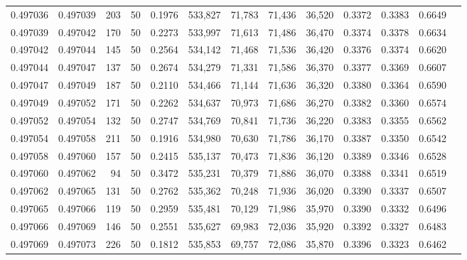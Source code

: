 \begin{tabular}{rrrrrrrrrrrrr}
0.497036 & 0.497039 &   203 &  50 &                                     0.1976 & 533,827 &  71,783 &  71,436 &  36,520 & 0.3372 & 0.3383 & 0.6649 \\
0.497039 & 0.497042 &   170 &  50 &                                     0.2273 & 533,997 &  71,613 &  71,486 &  36,470 & 0.3374 & 0.3378 & 0.6634 \\
0.497042 & 0.497044 &   145 &  50 &                                     0.2564 & 534,142 &  71,468 &  71,536 &  36,420 & 0.3376 & 0.3374 & 0.6620 \\
0.497044 & 0.497047 &   137 &  50 &                                     0.2674 & 534,279 &  71,331 &  71,586 &  36,370 & 0.3377 & 0.3369 & 0.6607 \\
0.497047 & 0.497049 &   187 &  50 &                                     0.2110 & 534,466 &  71,144 &  71,636 &  36,320 & 0.3380 & 0.3364 & 0.6590 \\
0.497049 & 0.497052 &   171 &  50 &                                     0.2262 & 534,637 &  70,973 &  71,686 &  36,270 & 0.3382 & 0.3360 & 0.6574 \\
0.497052 & 0.497054 &   132 &  50 &                                     0.2747 & 534,769 &  70,841 &  71,736 &  36,220 & 0.3383 & 0.3355 & 0.6562 \\
0.497054 & 0.497058 &   211 &  50 &                                     0.1916 & 534,980 &  70,630 &  71,786 &  36,170 & 0.3387 & 0.3350 & 0.6542 \\
0.497058 & 0.497060 &   157 &  50 &                                     0.2415 & 535,137 &  70,473 &  71,836 &  36,120 & 0.3389 & 0.3346 & 0.6528 \\
0.497060 & 0.497062 &    94 &  50 &                                     0.3472 & 535,231 &  70,379 &  71,886 &  36,070 & 0.3388 & 0.3341 & 0.6519 \\
0.497062 & 0.497065 &   131 &  50 &                                     0.2762 & 535,362 &  70,248 &  71,936 &  36,020 & 0.3390 & 0.3337 & 0.6507 \\
0.497065 & 0.497066 &   119 &  50 &                                     0.2959 & 535,481 &  70,129 &  71,986 &  35,970 & 0.3390 & 0.3332 & 0.6496 \\
0.497066 & 0.497069 &   146 &  50 &                                     0.2551 & 535,627 &  69,983 &  72,036 &  35,920 & 0.3392 & 0.3327 & 0.6483 \\
0.497069 & 0.497073 &   226 &  50 &                                     0.1812 & 535,853 &  69,757 &  72,086 &  35,870 & 0.3396 & 0.3323 & 0.6462 \\

\end{tabular}
